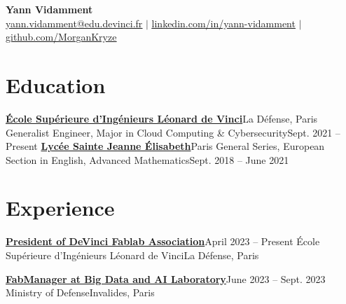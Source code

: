 \documentclass[letterpaper,11pt]{article}
\begin{document}
\begin{center}
  \textbf{\Huge Yann Vidamment} \\ \vspace{1pt}
  \href{mailto:yann.vidamment@edu.devinci.fr}{\underline{yann.vidamment@edu.devinci.fr}} $|$ 
  \href{https://linkedin.com/in/yann-vidamment-80a512254/}{\underline{linkedin.com/in/yann-vidamment}} $|$
  \href{https://github.com/MorganKryze}{\underline{github.com/MorganKryze}}
\end{center}

\section{Education}
  \resumeSubHeadingListStart
    \resumeSubheading
      {\href{https://www.esilv.fr/}{\textbf{École Supérieure d'Ingénieurs Léonard de Vinci}}}{La Défense, Paris}
      {Generalist Engineer, Major in Cloud Computing \& Cybersecurity}{Sept. 2021 -- Present}
    \resumeSubheading
      {\href{https://www.ste-jeanne-elisabeth.com/}{\textbf{Lycée Sainte Jeanne Élisabeth}}}{Paris}
      {General Series, European Section in English, Advanced Mathematics}{Sept. 2018 -- June 2021}
  \resumeSubHeadingListEnd

\section{Experience}
  \resumeSubHeadingListStart
    \resumeSubheading
      {\href{https://dvic.devinci.fr/fablab/}{\textbf{President of DeVinci Fablab Association}}}{April 2023 -- Present}
      {École Supérieure d'Ingénieurs Léonard de Vinci}{La Défense, Paris}
      \resumeItemListStart
      \resumeItemListEnd

    \resumeSubheading
      {\href{https://www.defense.gouv.fr/sga/nous-connaitre/organisation-du-sga/directions/delegation-transformation-performance-ministerielles}{\textbf{FabManager at Big Data and AI Laboratory}}}{June 2023 -- Sept. 2023}
      {Ministry of Defense}{Invalides, Paris}
      \resumeItemListStart
      \resumeItemListEnd
\end{document}
